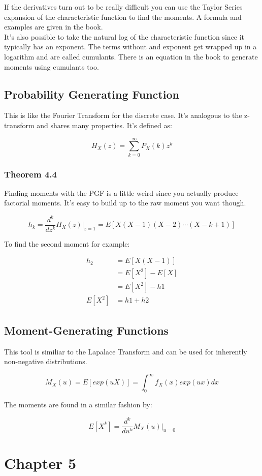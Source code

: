 \documentclass[12pt]{article}
\begin{document}
If the derivatives turn out to be really difficult you can use
the Taylor Series expansion of the characteristic function to find
the moments. A formula and examples are given in the book. \\

It's also possible to take the natural log of the characteristic
function since it typically has an exponent. The terms without 
and exponent get wrapped up in a logarithm and are called cumulants.
There is an equation in the book to generate moments using cumulants
too.

\subsection{Probability Generating Function}
This is like the Fourier Transform for the discrete case. It's
analogous to the z-transform and shares many properties. It's
defined as:

\[H_X(z) = \sum_{k=0}^\infty P_X(k)z^k \]

\subsubsection{Theorem 4.4}
Finding moments with the PGF is a little weird since you
actually produce factorial moments. It's easy to build up to 
the raw moment you want though.

\[h_k = \frac{d^k}{dz^k}H_X(z)\big|_{z=1} = E[X(X-1)(X-2)\cdots(X-k+1)]\]

To find the second moment for example:

\begin{align}
  h_2 &= E[X(X-1)] \\
  &= E[X^2] - E[X] \\
  &= E[X^2] - h1 \\
  E[X^2] &= h1+h2
\end{align}

\subsection{Moment-Generating Functions}
This tool is similiar to the Lapalace Transform and can be used for
inherently non-negative distributions.

\[M_X(u) = E[exp(uX)] = \int_0^\infty f_X(x)exp(ux)dx\]

The moments are found in a similar fashion by:

\[E[X^k] = \frac{d^k}{du^k}M_X(u)\big|_{u=0}\]

\section{Chapter 5}
\end{document}
